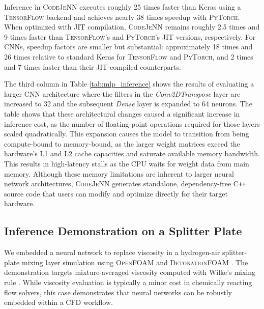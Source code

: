\documentclass[preprint,12pt, a4paper]{elsarticle}
\begin{document}
Inference in \textsc{CodeJeNN} executes roughly 25 times faster than Keras using a \textsc{TensorFlow} backend and achieves nearly 38 times speedup with \textsc{PyTorch}. When optimized with JIT compilation, \textsc{CodeJeNN} remains roughly 2.5 times and 9 times faster than \textsc{TensorFlow}'s and \textsc{PyTorch}'s JIT versions, respectively. For CNNs, speedup factors are smaller but substantial: approximately 18 times and 26 times relative to standard Keras for \textsc{TensorFlow} and \textsc{PyTorch}, and 2 times and 7 times faster than their JIT-compiled counterparts.

The third column in Table \ref{tab:mlp_inference} shows the results of evaluating a larger CNN architecture where the filters in the \textit{Conv2DTranspose} layer are increased to 32 and the subsequent \textit{Dense} layer is expanded to 64 neurons. The table shows that these architectural changes caused a significant increase in inference cost, as the number of floating-point operations required for those layers scaled quadratically. This expansion causes the model to transition from being compute-bound to memory-bound, as the larger weight matrices exceed the hardware's L1 and L2 cache capacities and saturate available memory bandwidth. This results in high-latency stalls as the CPU waits for weight data from main memory. Although these memory limitations are inherent to larger neural network architectures, \textsc{CodeJeNN} generates standalone, dependency-free C\texttt{++} source code that users can modify and optimize directly for their target hardware.

\subsection{Inference Demonstration on a Splitter Plate}
We embedded a neural network to replace viscosity in a hydrogen-air splitter-plate mixing layer simulation using \textsc{OpenFOAM} \cite{weller_tensorial_1998} and \textsc{DetonationFOAM} \cite{sun_detonationfoam_2023}. The demonstration targets mixture-averaged viscosity computed with Wilke's mixing rule \cite{wilke_viscosity_1950}. While viscosity evaluation is typically a minor cost in chemically reacting flow solvers, this case demonstrates that neural networks can be robustly embedded within a CFD workflow.
\end{document}
